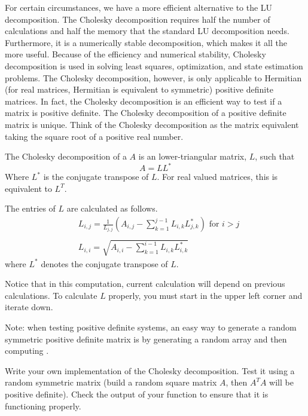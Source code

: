 For certain circumstances, we have a more efficient alternative to the LU decomposition.
The Cholesky decomposition requires half the number of calculations and half the memory that the standard LU decomposition needs.
Furthermore, it is a numerically stable decomposition, which makes it all the more useful.
Because of the efficiency and numerical stability, Cholesky decomposition is used in solving least squares, optimization, and state estimation problems.
The Cholesky decomposition, however, is only applicable to Hermitian (for real matrices, Hermitian is equivalent to symmetric) positive definite matrices.
In fact, the Cholesky decomposition is an efficient way to test if a matrix is positive definite.
The Cholesky decomposition of a positive definite matrix is unique.
Think of the Cholesky decomposition as the matrix equivalent taking the square root of a positive real number.

The Cholesky decomposition of a $A$ is an lower-triangular matrix, $L$, such that
\begin{equation*}
 A = LL^*
\end{equation*}
Where $L^*$ is the conjugate transpose of $L$.
For real valued matrices, this is equivalent to $L^T$.

The entries of $L$ are calculated as follows.
\begin{align*}
&L_{i,j} = \frac{1}{L_{j,j}}\left(A_{i,j} -\sum_{k=1}^{j-1}{L_{i,k}L_{j,k}^*}\right) \mbox{ for $i>j$} \\ \\
&L_{i,i} = \sqrt{A_{i,i} - \sum_{k=1}^{i-1}{L_{i,k}L_{i,k}^*}}
\end{align*}
where $L^*$ denotes the conjugate transpose of $L$.

Notice that in this computation, current calculation will depend on previous calculations.
To calculate $L$ properly, you must start in the upper left corner and iterate down.

Note: when testing positive definite systems, an easy way to generate a random symmetric positive definite matrix is by generating a random array  and then computing .

\begin{problem}
Write your own implementation of the Cholesky decomposition.
Test it using a random symmetric matrix (build a random square matrix $A$, then $A^TA$ will be positive definite).
Check the output of your function to ensure that it is functioning properly.
\end{problem}

